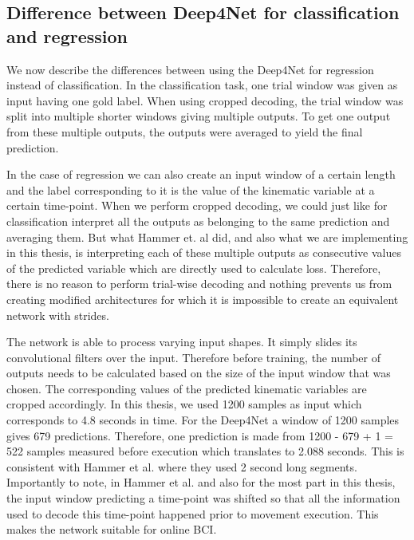 \subsection{Difference between Deep4Net for classification and regression}\label{subsec:difference-between-deep4net-for-classification-and-regression}
We now describe the differences between using the Deep4Net for regression instead of classification.
In the classification task, one trial window was given as input having one gold label.
When using cropped decoding, the trial window was split into multiple shorter windows giving multiple outputs.
To get one output from these multiple outputs, the outputs were averaged to yield the final prediction.

In the case of regression we can also create an input window of a certain length and the label corresponding to it is the value of the kinematic variable at a certain time-point.
When we perform cropped decoding, we could just like for classification interpret all the outputs as belonging to the same prediction and averaging them.
But what Hammer et. al did, and also what we are implementing in this thesis, is interpreting each of these multiple outputs as consecutive values of the predicted variable which are directly used to calculate loss.
Therefore, there is no reason to perform trial-wise decoding and nothing prevents us from creating modified architectures for which it is impossible to create an equivalent network with strides.

The network is able to process varying input shapes.
It simply slides its convolutional filters over the input.
Therefore before training, the number of outputs needs to be calculated based on the size of the input window that was chosen.
The corresponding values of the predicted kinematic variables are cropped accordingly.
In this thesis, we used 1200 samples as input which corresponds to 4.8 seconds in time.
For the Deep4Net a window of 1200 samples gives 679 predictions.
Therefore, one prediction is made from 1200 - 679 + 1 = 522 samples measured before execution which translates to 2.088 seconds.
This is consistent with Hammer et al. where they used 2 second long segments.
Importantly to note, in Hammer et al. and also for the most part in this thesis, the input window predicting a time-point was shifted so that all the information used to decode this time-point happened prior to movement execution.
This makes the network suitable for online BCI.
